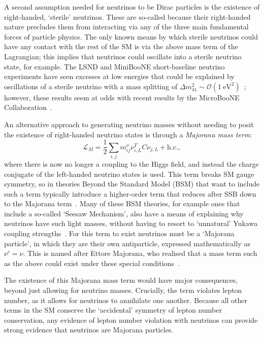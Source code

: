 A second assumption needed for neutrinos to be Dirac particles is the existence of right-handed, `sterile' neutrinos. These are so-called because their right-handed nature precludes them from interacting via any of the three main fundamental forces of particle physics. The only known means by which sterile neutrinos could have any contact with the rest of the SM is via the above mass term of the Lagrangian; this implies that neutrinos could oscillate into a sterile neutrino state, for example. The LSND and MiniBooNE short-baseline neutrino experiments have seen excesses at low energies that could be explained by oscillations of a sterile neutrino with a mass splitting of $\Delta m^{2}_{41}\sim\mathcal{O}(\SI{1}{\eV\squared})$~\cite{}; %
however, these results seem at odds with recent results by the MicroBooNE Collaboration~\cite{}. %

An alternative approach to generating neutrino masses without needing to posit the existence of right-handed neutrino states is through a \textit{Majorana mass term}:
\begin{equation}
    \mathcal{L}_{M} = \frac{1}{2}\sum_{i,j}m^{\nu}_{ij}\nu^{T}_{i,L}C\nu_{j,L} + \mathrm{ h.c.},
\end{equation}
where there is now no longer a coupling to the Higgs field, and instead the charge conjugate of the left-handed neutrino states is used. This term breaks SM gauge symmetry, so in theories Beyond the Standard Model (BSM) that want to include such a term typically introduce a higher-order term that reduces after SSB down to the Majorana term~\cite{}. %
Many of these BSM theories, for example ones that include a so-called `Seesaw Mechanism', also have a means of explaining why neutrinos have such light masses, without having to resort to `unnatural' Yukawa coupling strengths~\cite{}. %
For this term to exist neutrinos must be a `Majorana particle', in which they are their own antiparticle, expressed mathematically as $\nu^{c} = \nu$. This is named after Ettore Majorana, who realised that a mass term such as the above could exist under these special conditions~\cite{}. %

The existence of this Majorana mass term would have major consequences, beyond just allowing for neutrino masses. Crucially, the term violates lepton number, as it allows for neutrinos to annihilate one another. Because all other terms in the SM conserve the `accidental' symmetry of lepton number conservation, any evidence of lepton number violation with neutrinos can provide strong evidence that neutrinos are Majorana particles.

